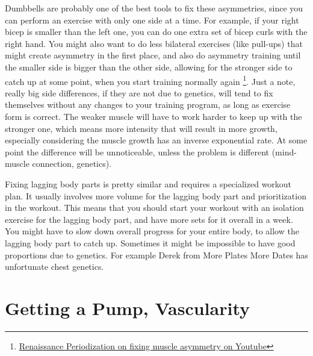 \documentclass[openany, 12pt]{book}
\begin{document}
        Dumbbells are probably one of the best tools to fix these asymmetries, since you can perform an exercise with only one side at a time. For example, if your right bicep is smaller than
        the left one, you can do one extra set of bicep curls with the right hand.
        You might also want to do less bilateral exercises (like pull-ups) that might create asymmetry in the first place, and also do asymmetry training until the smaller side is bigger than the other
        side, allowing for the stronger side to catch up at some point, when you start training normally again
        \footnote{\href{https://www.youtube.com/watch?v=FP2dyni-dgA}{Renaissance Periodization on fixing muscle asymmetry on Youtube}}.
        Just a note, really big side differences, if they are not due to genetics, will tend to fix themselves without any changes to your training program, as long as exercise form is correct.
        The weaker muscle will have to work harder to keep up with the stronger one, which means more intensity that will result in more growth, especially considering the muscle growth has an
        inverse exponential rate. At some point the difference will be unnoticeable, unless the problem is different (mind-muscle connection, genetics).

        Fixing lagging body parts is pretty similar and requires a specialized workout plan. It usually involves more volume for the lagging body part and prioritization in the workout. This means that
        you should start your workout with an isolation exercise for the lagging body part, and have more sets for it overall in a week.
        You might have to slow down overall progress for your entire body, to allow the lagging body part to catch up. Sometimes it might be impossible to have good proportions due to genetics. For example
        Derek from More Plates More Dates has unfortunate chest genetics.

        \section{Getting a Pump, Vascularity}
\end{document}
